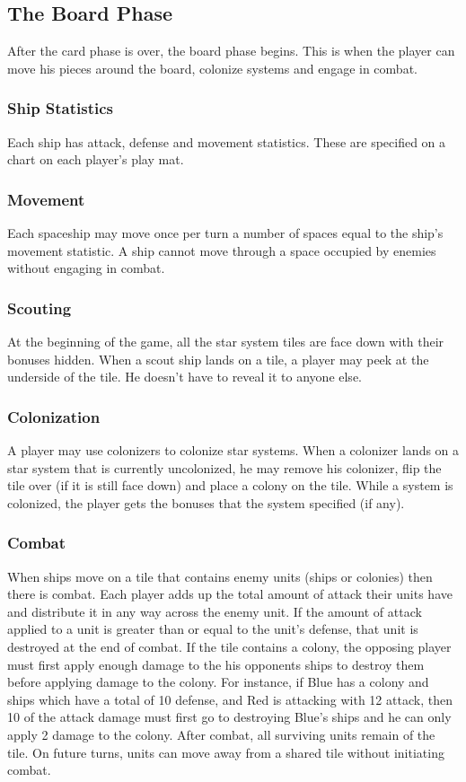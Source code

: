 \documentclass[12pt]{article} %
\begin{document}
\subsection{The Board Phase}
After the card phase is over, the board phase begins.  This is when the player can move his pieces around the board, colonize systems and engage in combat.

\subsubsection{Ship Statistics}
Each ship has attack, defense and movement statistics.  These are specified on a chart on each player's play mat.  

\subsubsection{Movement}
Each spaceship may move once per turn a number of spaces equal to the ship's movement statistic.  A ship cannot move through a space occupied by enemies without engaging in combat.

\subsubsection{Scouting}
At the beginning of the game, all the star system tiles are face down with their bonuses hidden.  When a scout ship lands on a tile, a player may peek at the underside of the tile.  He doesn't have to reveal it to anyone else.

\subsubsection{Colonization}
A player may use colonizers to colonize star systems.  When a colonizer lands on a star system that is currently uncolonized, he may remove his colonizer, flip the tile over (if it is still face down) and place a colony on the tile.  While a system is colonized, the player gets the bonuses that the system specified (if any).

\subsubsection{Combat}
When ships move on a tile that contains enemy units (ships or colonies) then there is combat.  Each player adds up the total amount of attack their units have and distribute it in any way across the enemy unit.  If the amount of attack applied to a unit is greater than or equal to the unit's defense, that unit is destroyed at the end of combat.  If the tile contains a colony, the opposing player must first apply enough damage to the his opponents ships to destroy them before applying damage to the colony.  For instance, if Blue has a colony and ships which have a total of 10 defense, and Red is attacking with 12 attack, then 10 of the attack damage must first go to destroying Blue's ships and he can only apply 2 damage to the colony.  After combat, all surviving units remain of the tile.  On future turns, units can move away from a shared tile without initiating combat.
\end{document}
